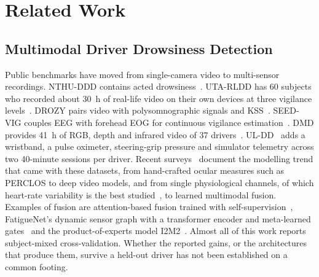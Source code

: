 \documentclass[journal]{IEEEtran}
\begin{document}
\section{Related Work}
\subsection{Multimodal Driver Drowsiness Detection}
Public benchmarks have moved from single-camera video to multi-sensor
recordings. NTHU-DDD contains acted drowsiness~\cite{weng2017nthu}. UTA-RLDD
has 60 subjects who recorded about 30~h of real-life video on their own
devices at three vigilance levels~\cite{ghoddoosian2019uta}. DROZY pairs video
with polysomnographic signals and KSS~\cite{massoz2016drozy}. SEED-VIG couples
EEG with forehead EOG for continuous vigilance
estimation~\cite{zheng2017vigilance}. DMD provides 41~h of RGB, depth and
infrared video of 37 drivers~\cite{ortega2020dmd}. UL-DD~\cite{bodaghi2026uldd}
adds a wristband, a pulse oximeter, steering-grip pressure and simulator
telemetry across two 40-minute sessions per driver. Recent
surveys~\cite{fu2024survey,albadawi2022review,saleem2023review} document the
modelling trend that came with these datasets, from hand-crafted ocular
measures such as PERCLOS to deep video models, and from single physiological
channels, of which heart-rate variability is the best
studied~\cite{lu2022hrv,jiao2024hrveda}, to learned multimodal fusion.
Examples of fusion are attention-based fusion trained with
self-supervision~\cite{mou2023isotropic}, FatigueNet's dynamic sensor graph
with a transformer encoder and meta-learned gates~\cite{zendehbad2025fatiguenet}
and the product-of-experts model I2M2~\cite{madaan2024i2m2}. Almost all of
this work reports subject-mixed cross-validation. Whether the reported gains,
or the architectures that produce them, survive a held-out driver has not been
established on a common footing.
\end{document}

